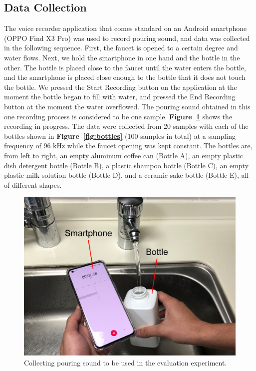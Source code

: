 \documentclass[sigconf]{acmart}
\newcommand\figref[1]{\textbf{Figure~\ref{fig:#1}}}
\begin{document}
\subsection{Data Collection}
The voice recorder application that comes standard on an Android smartphone (OPPO Find X3 Pro) was used to record pouring sound, and data was collected in the following sequence. First, the faucet is opened to a certain degree and water flows. Next, we hold the smartphone in one hand and the bottle in the other. The bottle is placed close to the faucet until the water enters the bottle, and the smartphone is placed close enough to the bottle that it does not touch the bottle. We pressed the Start Recording button on the application at the moment the bottle began to fill with water, and pressed the End Recording button at the moment the water overflowed. The pouring sound obtained in this one recording process is considered to be one sample. \figref{data_acquisition} shows the recording in progress. The data were collected from 20 samples with each of the bottles shown in \figref{bottles} (100 samples in total) at a sampling frequency of 96 kHz while the faucet opening was kept constant. The bottles are, from left to right, an empty aluminum coffee can (Bottle A), an empty plastic dish detergent bottle (Bottle B), a plastic shampoo bottle (Bottle C), an empty plastic milk solution bottle (Bottle D), and a ceramic sake bottle (Bottle E), all of different shapes.

\begin{figure}[!t]
  \centering
  \includegraphics[width=1\linewidth]{figures/data_acquisition.eps}
  \caption{Collecting pouring sound to be used in the evaluation experiment.}
  \label{fig:data_acquisition}
\end{figure}
\end{document}
